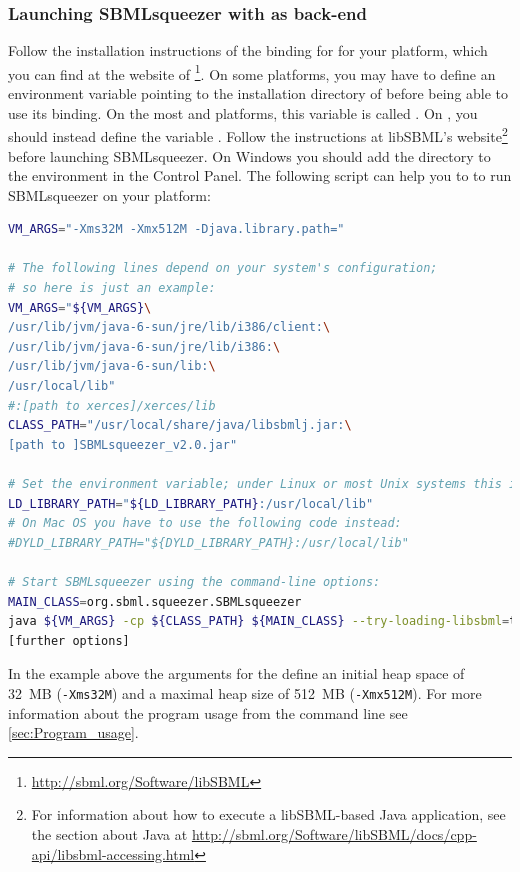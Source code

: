 \subsubsection{Launching SBMLsqueezer with \libSBML as back-end}
\label{sec:UsingLibSBML}
Follow the installation instructions of the \Java binding for \libSBML for your
platform, which you can find at the website of
\libSBML\footnote{\url{http://sbml.org/Software/libSBML}}.
On some platforms, you may have to define an environment variable pointing
to the installation directory of \libSBML before being able to use its \Java
binding.
On the most \Unix and \Linux platforms, this variable is called
\LDLIBRARYPATH.
On \MacOSX, you should instead define the variable \DYLDLIBRARYPATH.
Follow the instructions at libSBML's website\footnote{For information about how to execute a libSBML-based Java application, see the section about Java at \href{http://sbml.org/Software/libSBML/docs/cpp-api/libsbml-accessing.html}{\url{http://sbml.org/Software/libSBML/docs/cpp-api/libsbml-accessing.html}}} %
before launching SBMLsqueezer.
On Windows you should add the directory to the \PATH environment in the Control Panel.
The following script can help you to to run SBMLsqueezer on your \Unix platform:
\begin{lstlisting}[language=bash, caption={Example Bash script that launches SBMLsqueezer with a \libSBML back-end}]
VM_ARGS="-Xms32M -Xmx512M -Djava.library.path="

# The following lines depend on your system's configuration;
# so here is just an example:
VM_ARGS="${VM_ARGS}\
/usr/lib/jvm/java-6-sun/jre/lib/i386/client:\
/usr/lib/jvm/java-6-sun/jre/lib/i386:\
/usr/lib/jvm/java-6-sun/lib:\
/usr/local/lib"
#:[path to xerces]/xerces/lib
CLASS_PATH="/usr/local/share/java/libsbmlj.jar:\
[path to ]SBMLsqueezer_v2.0.jar"

# Set the environment variable; under Linux or most Unix systems this is
LD_LIBRARY_PATH="${LD_LIBRARY_PATH}:/usr/local/lib"
# On Mac OS you have to use the following code instead:
#DYLD_LIBRARY_PATH="${DYLD_LIBRARY_PATH}:/usr/local/lib"

# Start SBMLsqueezer using the command-line options:
MAIN_CLASS=org.sbml.squeezer.SBMLsqueezer 
java ${VM_ARGS} -cp ${CLASS_PATH} ${MAIN_CLASS} --try-loading-libsbml=true\
[further options]
\end{lstlisting}
In the example above the arguments for the \JVM define an initial heap space of
32~MB (\texttt{-Xms32M}) and a maximal heap size of 512~MB (\texttt{-Xmx512M}).
For more information about the program usage from the command line see \vref{sec:Program_usage}.


